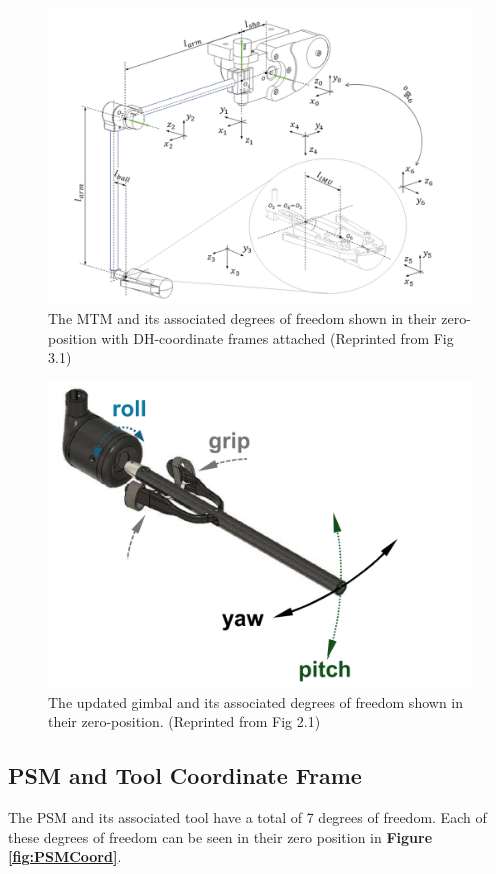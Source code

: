 \begin{figure}[H]
    \centering
    \includegraphics[width=0.7\linewidth]{figures/MTMcoords.png}
    \caption{The MTM and its associated degrees of freedom shown in their zero-position with DH-coordinate frames attached (Reprinted from \cite{walder2022design} Fig 3.1)}
    \label{fig:MTMcoords}
\end{figure}

\begin{figure}[H]
    \centering
    \includegraphics[width=0.7\linewidth]{figures/Gimbalcoords.png}
    \caption{The updated gimbal and its associated degrees of freedom shown in their zero-position.  (Reprinted from \cite{Messner2025Teleoperative} Fig 2.1)}
    \label{fig:GimbalCoords}
\end{figure}

\subsection{PSM and Tool Coordinate Frame}

The PSM and its associated tool have a total of 7 degrees of freedom. Each of these degrees of freedom can be seen in their zero position in \textbf{Figure \ref{fig:PSMCoord}}.

